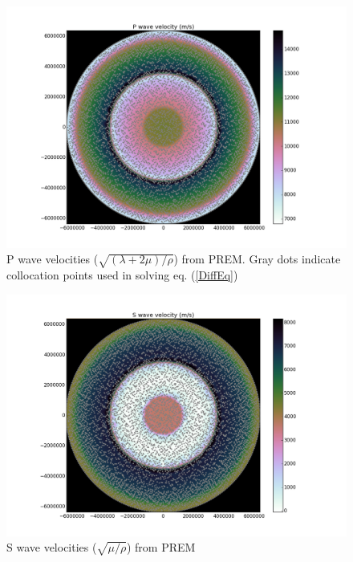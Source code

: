 \documentclass[12pt]{article}
\begin{document}
\begin{figure}
\includegraphics[scale=0.45]{figures/Pvel}
\centering
\caption{P wave velocities ($\sqrt{(\lambda + 2\mu)/\rho}$) from PREM.
  Gray dots indicate collocation points used in solving
  eq. (\ref{DiffEq})}

\end{figure}
\begin{figure}
\includegraphics[scale=0.45]{figures/Svel}
\centering
\caption{S wave velocities ($\sqrt{\mu/\rho}$) from PREM}

\end{figure}
\end{document}
